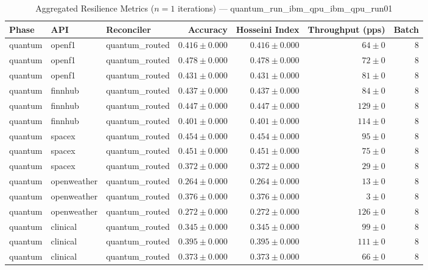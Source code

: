 
\begin{table}[htbp]
\caption{Aggregated Resilience Metrics ($n=1$ iterations) --- quantum_run_ibm_qpu_ibm_qpu_run01}
\begin{tabular}{l l l r r r r}
\hline
Phase & API & Reconciler & Accuracy & Hosseini Index & Throughput (pps) & Batch \\
\hline
quantum & openf1 & quantum\_routed & $0.416\pm0.000$ & $0.416\pm0.000$ & $64\pm0$ & 8 \\
quantum & openf1 & quantum\_routed & $0.478\pm0.000$ & $0.478\pm0.000$ & $72\pm0$ & 8 \\
quantum & openf1 & quantum\_routed & $0.431\pm0.000$ & $0.431\pm0.000$ & $81\pm0$ & 8 \\
quantum & finnhub & quantum\_routed & $0.437\pm0.000$ & $0.437\pm0.000$ & $84\pm0$ & 8 \\
quantum & finnhub & quantum\_routed & $0.447\pm0.000$ & $0.447\pm0.000$ & $129\pm0$ & 8 \\
quantum & finnhub & quantum\_routed & $0.401\pm0.000$ & $0.401\pm0.000$ & $114\pm0$ & 8 \\
quantum & spacex & quantum\_routed & $0.454\pm0.000$ & $0.454\pm0.000$ & $95\pm0$ & 8 \\
quantum & spacex & quantum\_routed & $0.451\pm0.000$ & $0.451\pm0.000$ & $75\pm0$ & 8 \\
quantum & spacex & quantum\_routed & $0.372\pm0.000$ & $0.372\pm0.000$ & $29\pm0$ & 8 \\
quantum & openweather & quantum\_routed & $0.264\pm0.000$ & $0.264\pm0.000$ & $13\pm0$ & 8 \\
quantum & openweather & quantum\_routed & $0.376\pm0.000$ & $0.376\pm0.000$ & $3\pm0$ & 8 \\
quantum & openweather & quantum\_routed & $0.272\pm0.000$ & $0.272\pm0.000$ & $126\pm0$ & 8 \\
quantum & clinical & quantum\_routed & $0.345\pm0.000$ & $0.345\pm0.000$ & $99\pm0$ & 8 \\
quantum & clinical & quantum\_routed & $0.395\pm0.000$ & $0.395\pm0.000$ & $111\pm0$ & 8 \\
quantum & clinical & quantum\_routed & $0.373\pm0.000$ & $0.373\pm0.000$ & $66\pm0$ & 8 \\

\end{tabular}
\end{table}
